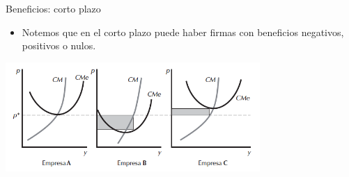 \documentclass{beamer}
\theoremstyle{definition}
\begin{document}
\begin{frame}{Beneficios: corto plazo}
    \begin{itemize}
        \item Notemos que en el corto plazo puede haber firmas con beneficios negativos, positivos o nulos.
    \end{itemize}
\begin{center}
\includegraphics[width=3.8in]{figures5/industry_profits.png}
\end{center}
\end{frame}
\end{document}
